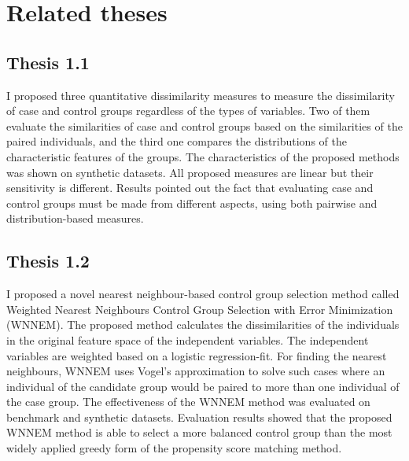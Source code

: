 		\section{Related theses}
		\label{theses_first}
         
		\subsection*{Thesis 1.1}
				
		I proposed three quantitative dissimilarity measures to measure the dissimilarity of case and control groups regardless of the types of variables. Two of them evaluate the similarities of case and control groups based on the similarities of the paired individuals, and the third one compares the distributions of the characteristic features of the groups. The characteristics of the proposed methods was shown on synthetic datasets. All proposed measures are linear but their sensitivity is different. Results pointed out the fact that evaluating case and control groups must be made from different aspects, using both pairwise and distribution-based measures. 

        
				        
				        
		\subsection*{Thesis 1.2}
				        
		I proposed a novel nearest neighbour-based control group selection method called Weighted Nearest Neighbours Control Group Selection with Error Minimization (WNNEM). The proposed method calculates the dissimilarities of the individuals in the original feature space of the independent variables. The independent variables are weighted based on a logistic regression-fit. For finding the nearest neighbours, WNNEM uses Vogel's approximation to solve such cases where an individual of the candidate group would be paired to more than one individual of the case group. The effectiveness of the WNNEM method was evaluated on benchmark and synthetic datasets. Evaluation results showed that the proposed WNNEM method is able to select a more balanced control group than the most widely applied greedy form of the propensity score matching method.
  
